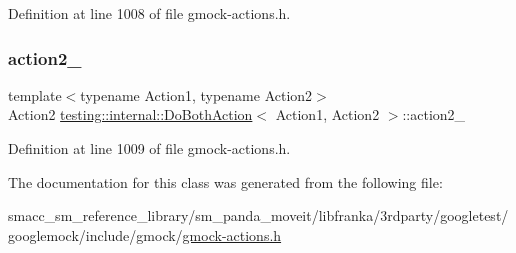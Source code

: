 Definition at line 1008 of file gmock-\/actions.\+h.

\mbox{\label{classtesting_1_1internal_1_1DoBothAction_a414a3fe2381da32b235524338bbb592e}} 
\subsubsection{\texorpdfstring{action2\+\_\+}{action2\_}}
{\footnotesize\ttfamily template$<$typename Action1, typename Action2$>$ \\
Action2 \hyperlink{classtesting_1_1internal_1_1DoBothAction}{testing\+::internal\+::\+Do\+Both\+Action}$<$ Action1, Action2 $>$\+::action2\+\_\+\hspace{0.3cm}{\ttfamily [private]}}



Definition at line 1009 of file gmock-\/actions.\+h.



The documentation for this class was generated from the following file\+:\begin{DoxyCompactItemize}
\item 
smacc\+\_\+sm\+\_\+reference\+\_\+library/sm\+\_\+panda\+\_\+moveit/libfranka/3rdparty/googletest/googlemock/include/gmock/\hyperlink{gmock-actions_8h}{gmock-\/actions.\+h}\end{DoxyCompactItemize}
